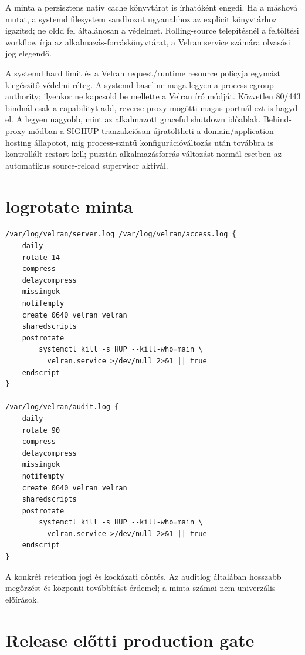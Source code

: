 A minta a perzisztens natív cache könyvtárat is írhatóként engedi. Ha a  máshová mutat, a systemd filesystem sandboxot ugyanahhoz az explicit könyvtárhoz igazítsd; ne oldd fel általánosan a  védelmet. Rolling-source telepítésnél a feltöltési workflow írja az alkalmazás-forráskönyvtárat, a Velran service számára olvasási jog elegendő.\par\medskip

A systemd hard limit és a Velran request/runtime resource policyja egymást kiegészítő védelmi réteg. A systemd baseline maga legyen a process cgroup authority; ilyenkor ne kapcsold be mellette a Velran \code{[cgroup]} író módját. Közvetlen 80/443 bindnál csak a  capabilityt add, reverse proxy mögötti magas portnál ezt is hagyd el. A  legyen nagyobb, mint az alkalmazott graceful shutdown időablak. Behind-proxy módban a SIGHUP tranzakciósan újratöltheti a domain/application hosting állapotot, míg process-szintű konfigurációváltozás után továbbra is kontrollált restart kell; pusztán alkalmazásforrás-változást normál esetben az automatikus source-reload supervisor aktivál.

\section{logrotate minta}

\begin{lstlisting}
/var/log/velran/server.log /var/log/velran/access.log {
    daily
    rotate 14
    compress
    delaycompress
    missingok
    notifempty
    create 0640 velran velran
    sharedscripts
    postrotate
        systemctl kill -s HUP --kill-who=main \
          velran.service >/dev/null 2>&1 || true
    endscript
}

/var/log/velran/audit.log {
    daily
    rotate 90
    compress
    delaycompress
    missingok
    notifempty
    create 0640 velran velran
    sharedscripts
    postrotate
        systemctl kill -s HUP --kill-who=main \
          velran.service >/dev/null 2>&1 || true
    endscript
}
\end{lstlisting}

A konkrét retention jogi és kockázati döntés. Az auditlog általában hosszabb megőrzést és központi továbbítást érdemel; a minta számai nem univerzális előírások.

\section{Release előtti production gate}


